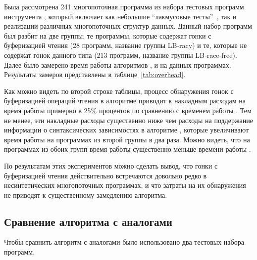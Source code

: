Была рассмотрена 241 многопоточная программа 
из набора тестовых программ инструмента \genmc, 
который включает как небольшие ``лакмусовые тесты''~\cite{Alglave-al:TACAS2011}, 
так и реализации различных многопоточных структур данных.
Данный набор программ был разбит на две группы:
те программы, которые содержат гонки с буферизацией чтения 
(28 программ, название группы LB-racy)
и те, которые не содержат гонок данного типа 
(213 программ, название группы LB-race-free).
Далее было замерено время работы алгоритмов \genmc, \hmc и \wmc на данных программах.  
Результаты замеров представлены в таблице~\ref{tab:overhead}.



Как можно видеть по второй строке таблицы, 
процесс обнаружения гонок с буферизацией операций чтения 
в алгоритме \wmc приводит к накладным расходам на время работы 
примерно в 25\% процентов по сравнению с временем работы \genmc.
Тем не менее, эти накладные расходы существенно ниже чем 
расходы на поддержание информации о синтаксических зависимостях
в алгоритме \hmc, которые увеличивают время работы \hmc
на программах из второй группы в два раза.  
Можно видеть, что на программах из обоих групп
время работы \wmc существенно меньше времени работы \hmc. 

По результатам этих экспериментов можно сделать вывод, 
что гонки с буферизацией чтения действительно встречаются 
довольно редко в несинтетических многопоточных программах, 
и что затраты на их обнаружения не приводят к существенному
замедлению алгоритма. 

\subsection*{Сравнение алгоритма \wmc с аналогами}

Чтобы сравнить алгоритм \wmc с аналогами было использовано 
два тестовых набора программ.

